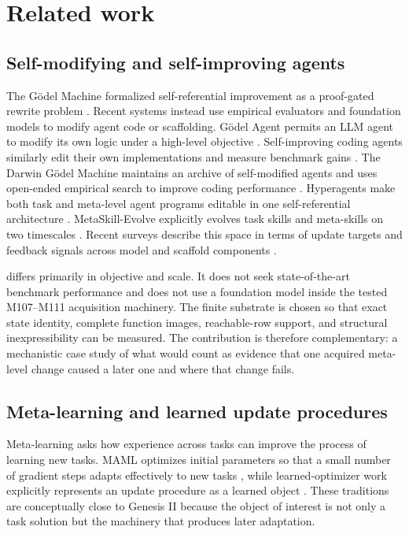 \section{Related work}
\label{sec:related}
\subsection{Self-modifying and self-improving agents}
The G{\"o}del Machine formalized self-referential improvement as a proof-gated rewrite problem \cite{schmidhuber2007godel}. Recent systems instead use empirical evaluators and foundation models to modify agent code or scaffolding. G{\"o}del Agent permits an LLM agent to modify its own logic under a high-level objective \cite{yin2024godelagent}. Self-improving coding agents similarly edit their own implementations and measure benchmark gains \cite{robeyns2025selfimproving}. The Darwin G{\"o}del Machine maintains an archive of self-modified agents and uses open-ended empirical search to improve coding performance \cite{zhang2025dgm}. Hyperagents make both task and meta-level agent programs editable in one self-referential architecture \cite{zhang2026hyperagents}. MetaSkill-Evolve explicitly evolves task skills and meta-skills on two timescales \cite{wang2026metaskill}. Recent surveys describe this space in terms of update targets and feedback signals across model and scaffold components \cite{ren2026survey}.

\genesis differs primarily in objective and scale. It does not seek state-of-the-art benchmark performance and does not use a foundation model inside the tested M107--M111 acquisition machinery. The finite substrate is chosen so that exact state identity, complete function images, reachable-row support, and structural inexpressibility can be measured. The contribution is therefore complementary: a mechanistic case study of what would count as evidence that one acquired meta-level change caused a later one and where that change fails.

\subsection{Meta-learning and learned update procedures}
Meta-learning asks how experience across tasks can improve the process of learning new tasks. MAML optimizes initial parameters so that a small number of gradient steps adapts effectively to new tasks \cite{finn2017maml}, while learned-optimizer work explicitly represents an update procedure as a learned object \cite{andrychowicz2016learning}. These traditions are conceptually close to Genesis II because the object of interest is not only a task solution but the machinery that produces later adaptation.

